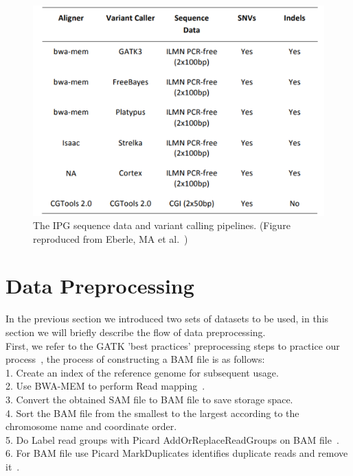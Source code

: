 \documentclass[PhD]{PHlab-thesis}
\begin{document}
\begin{figure}[h!]
	\centering
	\includegraphics[scale=0.4]{figures/IPG VariantCaller.png}
	\caption{The IPG sequence data and variant calling pipelines. (Figure reproduced from Eberle, MA et al.~\cite{Eberle2021IPG})}
	\label{fig:IPG VariantCaller} %
\end{figure}

\section{Data Preprocessing}
In the previous section we introduced two sets of datasets to be used, in this section we will briefly describe the flow of data preprocessing.\\
First, we refer to the GATK 'best practices' preprocessing steps to practice our process~\cite{Geraldine2013GATKBestP}, the process of constructing a BAM file is as follows:\\
1. Create an index of the reference genome for subsequent usage.\\
2. Use BWA-MEM to perform Read mapping~\cite{Li2013BWA}.\\3. Convert the obtained SAM file to BAM file to save storage space.\\
4. Sort the BAM file from the smallest to the largest according to the chromosome name and coordinate order.\\
5. Do Label read groups with Picard AddOrReplaceReadGroups on BAM file~\cite{AddOrReplaceReadGroups}.\\
6. For BAM file use Picard MarkDuplicates identifies duplicate reads and remove it~\cite{MarkDuplicates}.
\end{document}
